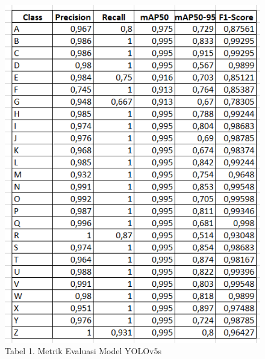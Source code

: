 \documentclass[12pt,a4paper]{article}
\begin{document}
\begin{figure}[h]
        \centering
        \includegraphics[width=0.6\linewidth]{Images/Gambar5Modelyolov5s.png}
        \caption*{Tabel 1. Metrik Evaluasi Model YOLOv5s}
        \label{fig:enter-label}
    \end{figure}
\end{document}
